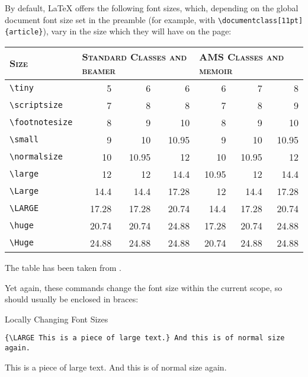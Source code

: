 \documentclass[a4paper,oneside,11pt]{article}
\newcommand\comm[1]{\texttt{\textbackslash#1}}
\newcommand\code[1]{\texttt{#1}}
\begin{document}
By  default, \LaTeX{}  offers the  following font  sizes, which,  depending on
the  global  document  font  size  set in  the  preamble  (for  example,  with
\code{\textbackslash{}documentclass[11pt]\{article\}}), vary in the size which
they will have on the page:

\begin{center}
    \begin{tabular}{lrrrrrr}
        \toprule
        \textsc{Size} &
        \multicolumn{3}{l}{\textsc{Standard Classes and beamer}} &
        \multicolumn{3}{l}{\textsc{AMS Classes and memoir}} \\
        \midrule
        \comm{tiny}         &  5    &  6     & 6     & 6     & 7     & 8     \\
        \comm{scriptsize}   &  7    &  8     & 8     & 7     & 8     & 9     \\
        \comm{footnotesize} &  8    &  9     & 10    & 8     & 9     & 10    \\
        \comm{small}        &  9    &  10    & 10.95 & 9     & 10    & 10.95 \\
        \comm{normalsize}   & 10    &  10.95 & 12    & 10    & 10.95 & 12    \\
        \comm{large}        & 12    &  12    & 14.4  & 10.95 & 12    & 14.4  \\
        \comm{Large}        & 14.4  &  14.4  & 17.28 & 12    & 14.4  & 17.28 \\
        \comm{LARGE}        & 17.28 &  17.28 & 20.74 & 14.4  & 17.28 & 20.74 \\
        \comm{huge}         & 20.74 &  20.74 & 24.88 & 17.28 & 20.74 & 24.88 \\
        \comm{Huge}         & 24.88 &  24.88 & 24.88 & 20.74 & 24.88 & 24.88 \\
        \bottomrule
    \end{tabular}
\end{center}

The table has been taken from \cite{wikibooks:fonts}.

Yet again, these commands change the font size within the current scope, so should
usually be enclosed in braces:

\begin{titled-frame}
{\textsf{Locally Changing Font Sizes}}
\vspace{-1em}
\begin{verbatim}
{\LARGE This is a piece of large text.} And this is of normal size again.
\end{verbatim}
{\LARGE This is a piece of large text.} And this is of normal size again.
\end{titled-frame}
\end{document}
